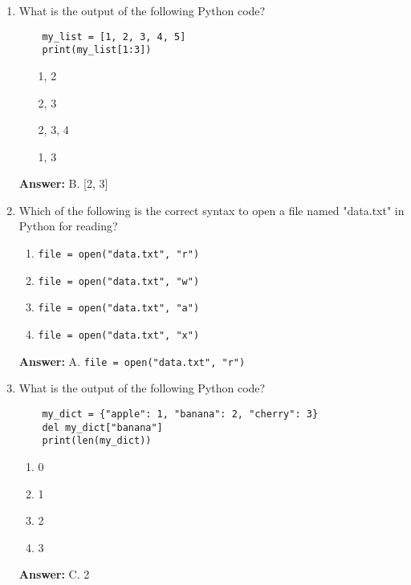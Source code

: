 \documentclass{article}
\begin{document}
\begin{enumerate}
    \item What is the output of the following Python code?

    \begin{verbatim}
    my_list = [1, 2, 3, 4, 5]
    print(my_list[1:3])
    \end{verbatim}

    \begin{enumerate}
        \item [1, 2]
        \item [2, 3]
        \item [2, 3, 4]
        \item [1, 3]
    \end{enumerate}
    \textbf{Answer:} B. [2, 3]

    \item Which of the following is the correct syntax to open a file named "data.txt" in Python for reading?
    \begin{enumerate}
        \item \verb|file = open("data.txt", "r")|
        \item \verb|file = open("data.txt", "w")|
        \item \verb|file = open("data.txt", "a")|
        \item \verb|file = open("data.txt", "x")|
    \end{enumerate}
    \textbf{Answer:} A. \verb|file = open("data.txt", "r")|

    \item What is the output of the following Python code?

    \begin{verbatim}
    my_dict = {"apple": 1, "banana": 2, "cherry": 3}
    del my_dict["banana"]
    print(len(my_dict))
    \end{verbatim}

    \begin{enumerate}
        \item 0
        \item 1
        \item 2
        \item 3
    \end{enumerate}
    \textbf{Answer:} C. 2


\end{enumerate}
\end{document}
